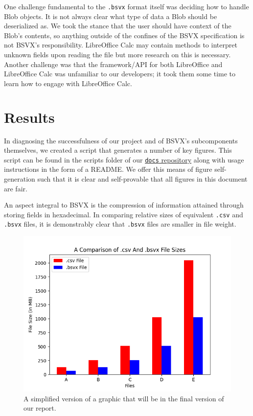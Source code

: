 \documentclass[10pt]{article}
\begin{document}
\indent{}
One challenge fundamental to the \texttt{.bsvx} format itself was deciding how to handle Blob objects.
It is not always clear what type of data a Blob should be deserialized as.
We took the stance that the user should have context of the Blob's contents, so anything outside of the confines of the BSVX specification is not BSVX's responsibility.
LibreOffice Calc may contain methods to interpret unknown fields upon reading the file but more research on this is necessary.
Another challenge was that the framework/API for both LibreOffice and LibreOffice Calc was unfamiliar to our developers; it took them some time to learn how to engage with LibreOffice Calc.

\section*{Results}

In diagnosing the successfulness of our project and of BSVX's subcomponents themselves, we created a script that generates a number of key figures.
This script can be found in the scripts folder of our \href{https://github.com/bsvx/docs}{\texttt{docs} repository} along with usage instructions in the form of a README.
We offer this means of figure self-generation such that it is clear and self-provable that all figures in this document are fair.

\indent{}
An aspect integral to BSVX is the compression of information attained through storing fields in hexadecimal.
In comparing relative sizes of equivalent \texttt{.csv} and \texttt{.bsvx} files, it is demonstrably clear that \texttt{.bsvx} files are smaller in file weight.

\begin{figure}[H]
\centering
\includegraphics[width=5in]{scripts/figures/1.png}
\caption{A simplified version of a graphic that will be in the final version of our report.}
\label{fig:results_1}
\end{figure}
\end{document}
